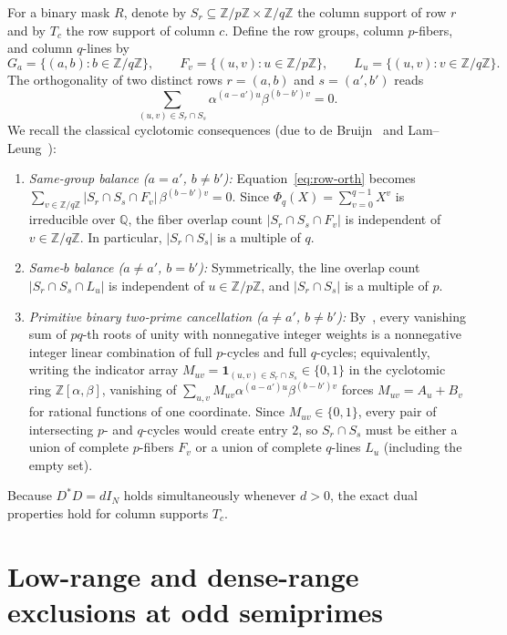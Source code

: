 \documentclass[11pt,reqno]{amsart}
\numberwithin{equation}{section}
\theoremstyle{definition}
\theoremstyle{remark}
\newcommand{\Q}{\mathbb{Q}}
\newcommand{\Z}{\mathbb{Z}}
\begin{document}
For a binary mask $R$, denote by $S_r\subseteq \Z/p\Z\times\Z/q\Z$ the column support of row $r$ and by $T_c$ the row support of column $c$. Define the row groups, column $p$-fibers, and column $q$-lines by
\[
G_a = \{(a,b) : b\in\Z/q\Z\},\qquad
F_v = \{(u,v) : u\in\Z/p\Z\},\qquad
L_u = \{(u,v) : v\in\Z/q\Z\}.
\]
The orthogonality of two distinct rows $r=(a,b)$ and $s=(a',b')$ reads
\begin{equation}
\label{eq:row-orth}
\sum_{(u,v)\in S_r\cap S_s} \alpha^{(a-a')u}\beta^{(b-b')v} = 0.
\end{equation}
We recall the classical cyclotomic consequences (due to de Bruijn~\cite{deB53} and Lam--Leung~\cite[Theorem~3.3 and Corollary~3.4]{LL00}):
\begin{enumerate}[label=(C\arabic*),leftmargin=2.4em]
\item \emph{Same-group balance ($a=a'$, $b\neq b'$):} Equation~\eqref{eq:row-orth} becomes $\sum_{v\in\Z/q\Z} |S_r\cap S_s\cap F_v|\,\beta^{(b-b')v}=0$. Since $\Phi_q(X)=\sum_{v=0}^{q-1}X^v$ is irreducible over $\Q$, the fiber overlap count $|S_r\cap S_s\cap F_v|$ is independent of $v\in\Z/q\Z$. In particular, $|S_r\cap S_s|$ is a multiple of $q$.
\item \emph{Same-$b$ balance ($a\neq a'$, $b=b'$):} Symmetrically, the line overlap count $|S_r\cap S_s\cap L_u|$ is independent of $u\in\Z/p\Z$, and $|S_r\cap S_s|$ is a multiple of $p$.
\item \emph{Primitive binary two-prime cancellation ($a\neq a'$, $b\neq b'$):} By~\cite[Theorem~3.3]{LL00}, every vanishing sum of $pq$-th roots of unity with nonnegative integer weights is a nonnegative integer linear combination of full $p$-cycles and full $q$-cycles; equivalently, writing the indicator array $M_{uv}=\mathbf{1}_{(u,v)\in S_r\cap S_s}\in\{0,1\}$ in the cyclotomic ring $\Z[\alpha,\beta]$, vanishing of $\sum_{u,v}M_{uv}\alpha^{(a-a')u}\beta^{(b-b')v}$ forces $M_{uv} = A_u + B_v$ for rational functions of one coordinate. Since $M_{uv}\in\{0,1\}$, every pair of intersecting $p$- and $q$-cycles would create entry $2$, so $S_r\cap S_s$ must be either a union of complete $p$-fibers $F_v$ or a union of complete $q$-lines $L_u$ (including the empty set).
\end{enumerate}
Because $D^*D=dI_N$ holds simultaneously whenever $d>0$, the exact dual properties hold for column supports $T_c$.

\section{Low-range and dense-range exclusions at odd semiprimes}
\label{sec:dense}
\end{document}

